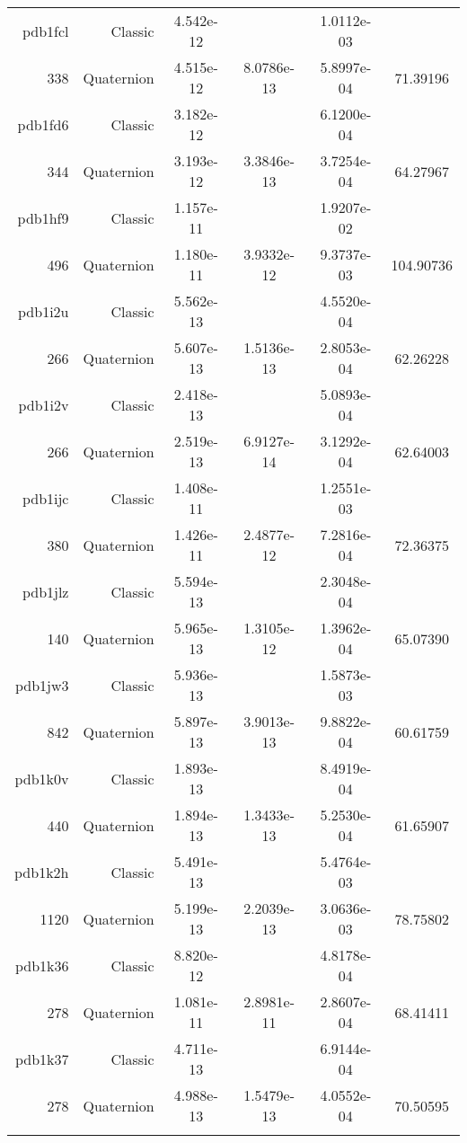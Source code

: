 \begin{xltabular}{\textwidth}{r|rS[table-format=1.3e+2]S[table-format=1.4e+2]S[table-format=1.4e+2]S[table-format=-1.5]}
pdb1fcl & Classic & 4.542e-12 &  & 1.0112e-03 & \\
338 & Quaternion & 4.515e-12 & 8.0786e-13 & 5.8997e-04 & 71.39196\\  \addlinespace
pdb1fd6 & Classic & 3.182e-12 &  & 6.1200e-04 & \\
344 & Quaternion & 3.193e-12 & 3.3846e-13 & 3.7254e-04 & 64.27967\\  \addlinespace
pdb1hf9 & Classic & 1.157e-11 &  & 1.9207e-02 & \\
496 & Quaternion & 1.180e-11 & 3.9332e-12 & 9.3737e-03 & 104.90736\\  \addlinespace
pdb1i2u & Classic & 5.562e-13 &  & 4.5520e-04 & \\
266 & Quaternion & 5.607e-13 & 1.5136e-13 & 2.8053e-04 & 62.26228\\  \addlinespace
pdb1i2v & Classic & 2.418e-13 &  & 5.0893e-04 & \\
266 & Quaternion & 2.519e-13 & 6.9127e-14 & 3.1292e-04 & 62.64003\\  \addlinespace
pdb1ijc & Classic & 1.408e-11 &  & 1.2551e-03 & \\
380 & Quaternion & 1.426e-11 & 2.4877e-12 & 7.2816e-04 & 72.36375\\  \addlinespace
pdb1jlz & Classic & 5.594e-13 &  & 2.3048e-04 & \\
140 & Quaternion & 5.965e-13 & 1.3105e-12 & 1.3962e-04 & 65.07390\\  \addlinespace
pdb1jw3 & Classic & 5.936e-13 &  & 1.5873e-03 & \\
842 & Quaternion & 5.897e-13 & 3.9013e-13 & 9.8822e-04 & 60.61759\\  \addlinespace
pdb1k0v & Classic & 1.893e-13 &  & 8.4919e-04 & \\
440 & Quaternion & 1.894e-13 & 1.3433e-13 & 5.2530e-04 & 61.65907\\  \addlinespace
pdb1k2h & Classic & 5.491e-13 &  & 5.4764e-03 & \\
1120 & Quaternion & 5.199e-13 & 2.2039e-13 & 3.0636e-03 & 78.75802\\  \addlinespace
pdb1k36 & Classic & 8.820e-12 &  & 4.8178e-04 & \\
278 & Quaternion & 1.081e-11 & 2.8981e-11 & 2.8607e-04 & 68.41411\\  \addlinespace
pdb1k37 & Classic & 4.711e-13 &  & 6.9144e-04 & \\
278 & Quaternion & 4.988e-13 & 1.5479e-13 & 4.0552e-04 & 70.50595\\  \addlinespace

\end{xltabular}
